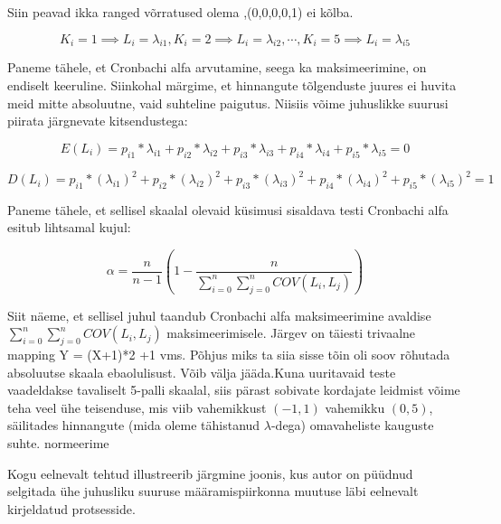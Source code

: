 \documentclass[a4paper,12pt]{article}
\numberwithin{equation}{section}
\theoremstyle{definition}
\begin{document}
{\color{cyan} Siin peavad ikka ranged võrratused olema ,(0,0,0,0,1) ei kõlba.}

\begin{equation*}
K_i = 1 \implies L_i = \lambda_{i1}, K_i = 2 \implies L_i = \lambda_{i2},\cdots, K_i = 5 \implies L_i =\lambda_{i5}
\end{equation*}

Paneme tähele, et Cronbachi alfa arvutamine, seega ka maksimeerimine, on endiselt keeruline. Siinkohal märgime, et hinnangute tõlgenduste juures ei huvita meid mitte absoluutne, vaid suhteline paigutus. Niisiis võime juhuslikke suurusi piirata järgnevate kitsendustega:


\begin{equation}
E(L_i) = p_{i1}*\lambda_{i1}+p_{i2}*\lambda_{i2}+p_{i3}*\lambda_{i3}+
p_{i4}*\lambda_{i4}+p_{i5}*\lambda_{i5}=0
\end{equation}

\begin{equation}
D(L_i) = 
p_{i1}*(\lambda_{i1})^2+ p_{i2}*(\lambda_{i2})^2 + p_{i3}*(\lambda_{i3})^2 + p_{i4}*(\lambda_{i4})^2 + p_{i5}*(\lambda_{i5})^2 = 1 
\end{equation}


Paneme tähele, et sellisel skaalal olevaid k\"usimusi sisaldava testi Cronbachi alfa esitub lihtsamal kujul:

\begin{equation}
\alpha = \frac{n}{n-1}\left(1 - \frac
{n}{\sum \limits_{i=0}^n \sum \limits_{j=0}^n COV(L_i,L_j)}\right)
\end{equation}

Siit näeme, et sellisel juhul taandub Cronbachi alfa maksimeerimine avaldise $\sum \limits_{i=0}^n \sum \limits_{j=0}^n COV(L_i,L_j)$ maksimeerimisele. {\color{cyan} Järgev on täiesti trivaalne mapping Y = (X+1)*2 +1 vms. Põhjus miks ta siia sisse tõin oli soov rõhutada absoluutse skaala ebaolulisust. Võib välja jääda.}Kuna uuritavaid teste vaadeldakse tavaliselt 5-palli skaalal, siis pärast sobivate kordajate leidmist võime teha veel \"uhe teisenduse, mis viib vahemikkust $(-1,1)$ vahemikku $(0,5)$, säilitades hinnangute (mida oleme tähistanud $\lambda$-dega) omavaheliste kauguste suhte. {\color{cyan} normeerime } 

Kogu eelnevalt tehtud illustreerib järgmine joonis, kus autor on p\"u\"udnud selgitada \"uhe juhusliku suuruse määramispiirkonna muutuse läbi eelnevalt kirjeldatud protsesside. 
\end{document}
